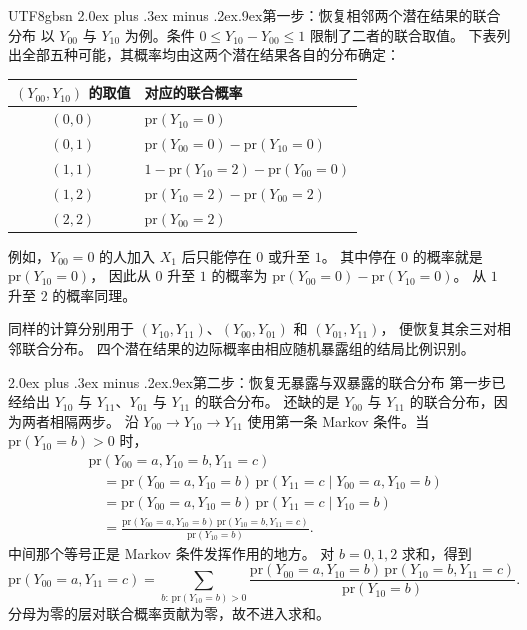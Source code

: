 \documentclass[11pt,a4paper]{article}
\makeatletter
\newcommand{\headingweight}{\ifPDFTeX\mdseries\else\bfseries\fi}
\renewcommand{\section}{\@startsection{section}{1}{0pt}
  {2.0ex plus .3ex minus .2ex}{.9ex}{\normalfont\large\headingweight}}
\makeatother
\begin{document}
\begin{CJK*}{UTF8}{gbsn}
\section{第一步：恢复相邻两个潜在结果的联合分布}
以 $Y_{00}$ 与 $Y_{10}$ 为例。条件 $0\le Y_{10}-Y_{00}\le1$ 限制了二者的联合取值。
下表列出全部五种可能，其概率均由这两个潜在结果各自的分布确定：
\begin{center}
\renewcommand{\arraystretch}{1.35}
\setlength{\tabcolsep}{12pt}
\begin{tabular}{@{}c l@{}}
\toprule
$(Y_{00},Y_{10})$ 的取值 & 对应的联合概率\\
\midrule
$(0,0)$ & $\mathrm{pr}(Y_{10}=0)$\\
$(0,1)$ & $\mathrm{pr}(Y_{00}=0)-\mathrm{pr}(Y_{10}=0)$\\
$(1,1)$ & $1-\mathrm{pr}(Y_{10}=2)-\mathrm{pr}(Y_{00}=0)$\\
$(1,2)$ & $\mathrm{pr}(Y_{10}=2)-\mathrm{pr}(Y_{00}=2)$\\
$(2,2)$ & $\mathrm{pr}(Y_{00}=2)$\\
\bottomrule
\end{tabular}
\end{center}
例如，$Y_{00}=0$ 的人加入 $X_1$ 后只能停在 $0$ 或升至 $1$。
其中停在 $0$ 的概率就是 $\mathrm{pr}(Y_{10}=0)$，
因此从 $0$ 升至 $1$ 的概率为 $\mathrm{pr}(Y_{00}=0)-\mathrm{pr}(Y_{10}=0)$。
从 $1$ 升至 $2$ 的概率同理。

同样的计算分别用于 $(Y_{10},Y_{11})$、$(Y_{00},Y_{01})$ 和 $(Y_{01},Y_{11})$，
便恢复其余三对相邻联合分布。
四个潜在结果的边际概率由相应随机暴露组的结局比例识别。

\clearpage
\section{第二步：恢复无暴露与双暴露的联合分布}
第一步已经给出 $Y_{10}$ 与 $Y_{11}$、$Y_{01}$ 与 $Y_{11}$ 的联合分布。
还缺的是 $Y_{00}$ 与 $Y_{11}$ 的联合分布，因为两者相隔两步。
沿 $Y_{00}\to Y_{10}\to Y_{11}$ 使用第一条 Markov 条件。当 $\mathrm{pr}(Y_{10}=b)>0$ 时，
\begin{equation}
\begin{aligned}
&\mathrm{pr}(Y_{00}=a,Y_{10}=b,Y_{11}=c)\\
&\quad=\mathrm{pr}(Y_{00}=a,Y_{10}=b)\,
       \mathrm{pr}(Y_{11}=c\mid Y_{00}=a,Y_{10}=b)\\
&\quad=\mathrm{pr}(Y_{00}=a,Y_{10}=b)\,
       \mathrm{pr}(Y_{11}=c\mid Y_{10}=b)\\
&\quad=\frac{\mathrm{pr}(Y_{00}=a,Y_{10}=b)\,
             \mathrm{pr}(Y_{10}=b,Y_{11}=c)}
            {\mathrm{pr}(Y_{10}=b)}.
\end{aligned}
\label{eq:triple}
\end{equation}
中间那个等号正是 Markov 条件发挥作用的地方。
对 $b=0,1,2$ 求和，得到
\begin{equation}
\mathrm{pr}(Y_{00}=a,Y_{11}=c)
=\sum_{b:\,\mathrm{pr}(Y_{10}=b)>0}
\frac{\mathrm{pr}(Y_{00}=a,Y_{10}=b)\,
      \mathrm{pr}(Y_{10}=b,Y_{11}=c)}
     {\mathrm{pr}(Y_{10}=b)}.
\label{eq:endpoints}
\end{equation}
分母为零的层对联合概率贡献为零，故不进入求和。


\end{CJK*}
\end{document}
